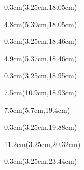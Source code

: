 \documentclass[a4paper]{article}
\begin{document}
\begin{Form}
\begin{textblock*}{0.3cm}(3.25cm,18.05cm) %
\noindent
\end{textblock*}

\begin{textblock*}{4.8cm}(5.39cm,18.05cm) %
\noindent
\Stunde
\end{textblock*}

\begin{textblock*}{0.3cm}(3.25cm,18.46cm) %
\noindent
\end{textblock*}

\begin{textblock*}{4.9cm}(5.37cm,18.46cm) %
\noindent
\ProMonat
\end{textblock*}

\begin{textblock*}{0.3cm}(3.25cm,18.95cm) %
\noindent
\end{textblock*}

\begin{textblock*}{7.5cm}(10.9cm,18.93cm) %
\noindent
\GeldwerteLeistungForm
\end{textblock*}

\begin{textblock*}{7.5cm}(5.7cm,19.4cm) %
\noindent
\GeldwerteLeistung
\end{textblock*}

\begin{textblock*}{0.3cm}(3.25cm,19.88cm) %
\noindent
\end{textblock*}

\begin{textblock*}{11.2cm}(3.25cm,20.32cm) %
\noindent
\SonstigeBerechnung
\end{textblock*}

\begin{textblock*}{0.3cm}(3.25cm,23.44cm) %
\noindent
\end{textblock*}


\end{Form}
\end{document}
